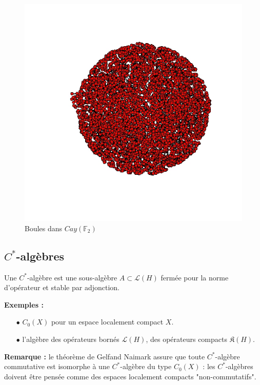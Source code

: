 \documentclass{beamer}
\begin{document}
\begin{frame}
\begin{figure}[h]\centering
\includegraphics[scale=0.35]{CayleyFree5.jpeg}
\caption{Boules dans $Cay(\mathbb F_2)$}
\label{fig:Cayley}
\end{figure}
\end{frame}

\subsection{$C^*$-algèbres}
\begin{frame}
\tableofcontents[currentsubsection]
\end{frame}

\begin{frame}
\begin{definition} Une $C^*$-algèbre est une sous-algèbre $A\subset \mathcal L(H)$
 fermée pour la norme d'opérateur et stable par adjonction.
\end{definition}
\textbf{Exemples :} 
\begin{itemize} 
\item[$\bullet$]$C_0(X)$ pour un espace localement compact $X$.
\item[$\bullet$] l'algèbre des opérateurs bornés $\mathcal L(H)$, des opérateurs compacts $\mathfrak K(H)$.
\end{itemize}

\textbf{Remarque :} le théorème de Gelfand Naimark assure que toute $C^*$-algèbre commutative est isomorphe à une $C^*$-algèbre du type $C_0(X)$ : les $C^*$-algèbres doivent être pensée comme des espaces localement compacts "non-commutatifs".
\end{frame}
\end{document}
